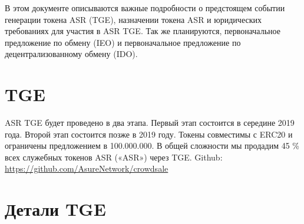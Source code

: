 
В этом документе описываются важные подробности о предстоящем событии генерации токена ASR (TGE), назначении токена ASR и юридических требованиях для участия в ASR TGE. Так же планируются, первоначальное предложение по обмену (IEO) и первоначальное предложение по децентрализованному обмену (IDO).

\section{TGE}
ASR TGE будет проведено в два этапа. Первый этап состоится в середине 2019 года. Второй этап состоится позже в 2019 году. Токены совместимы с ERC20 и ограничены предложением в 100.000.000. В общей сложности мы продадим 45 \% всех служебных токенов ASR («ASR») через TGE.
\newline\newline
Github: \url{https://github.com/AsureNetwork/crowdsale}

\newpage

\section{Детали TGE}

